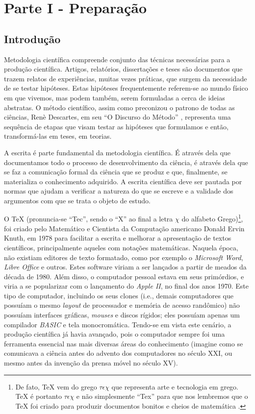 \chapter{Parte I - Preparação}
\label{cap:parteI}

\section{Introdução}
\label{sec:intro}

Metodologia científica compreende conjunto das técnicas necessárias para a produção científica. Artigos, relatórios, dissertações e teses são documentos que trazem relatos de experiências, muitas vezes práticas, que surgem da necessidade de se testar hipóteses. Estas hipóteses frequentemente referem-se ao mundo físico em que vivemos, mas podem também, serem formuladas a cerca de ideias abstratas. O método científico, assim como preconizou o patrono de todas as ciências, Renè Descartes, em seu ``O Discurso do Método'' \cite{descartes}, representa uma sequência de etapas que visam testar as hipóteses que formulamos e então, transformá-las em teses, em teorias.

A escrita é parte fundamental da metodologia científica. É através dela que documentamos todo o processo de desenvolvimento da ciência, é através dela que se faz a comunicação formal da ciência que se produz e que, finalmente, se materializa o conhecimento adquirido. A escrita científica deve ser pautada por normas que ajudam a verificar a natureza do que se escreve e a validade dos argumentos com que se trata o objeto de estudo.

O \TeX{} (pronuncia-se ``Tec'', sendo o ``X'' ao final a letra $\chi$ do alfabeto Grego)\footnote{De fato, \TeX{} vem do grego $\tau\epsilon\chi$ que representa arte e tecnologia em grego. \TeX{} é portanto $\tau\epsilon\chi$ e não simplesmente ``Tex'' para que nos lembremos que o \TeX{} foi criado para produzir documentos bonitos e cheios de matemática \cite{knuth/1996}.}, foi criado pelo Matemático e Cientista da Computação americano Donald Ervin Knuth, em 1978 para facilitar a escrita e melhorar a apresentação de textos científicos, principalmente aqueles com notações matemáticas. Naquela época, não existiam editores de texto formatado, como por exemplo o \textit{Microsoft Word}, \textit{Libre Office} e outros. Estes software viriam a ser lançados a partir de meados da década de 1980. Além disso, o computador pessoal estava em seus primórdios, e viria a se popularizar com o lançamento do \textit{Apple II}, no final dos anos 1970. Este tipo de computador, incluindo os seus clones (i.e., demais computadores que possuíam o mesmo \textit{layout} de processador e memória de acesso randômico) não possuíam interfaces gráficas, \textit{mouses} e discos rígidos; eles possuíam apenas um compilador \textit{BASIC} e tela monocromática. Tendo-se em vista este cenário, a produção científica já havia avançado, pois o computador sempre foi uma ferramenta essencial nas mais diversas áreas do conhecimento (imagine como se comunicava a ciência antes do advento dos computadores no século XXI, ou mesmo antes da invenção da prensa móvel no século XV). 

